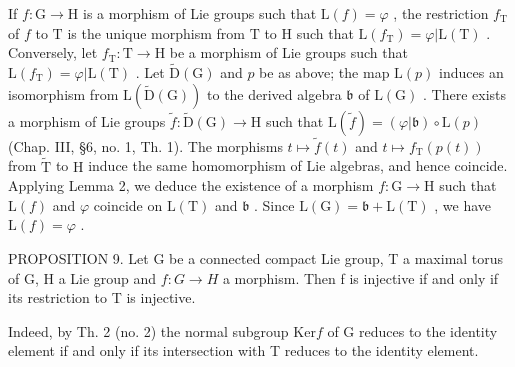 If \(f: \mathrm{G} \to \mathrm{H}\) is a morphism of Lie groups such that \(\mathrm{L}(f) = \varphi\) , the restriction \(f_{\mathrm{T}}\) of \(f\) to \(\mathrm{T}\) is the unique morphism from \(\mathrm{T}\) to \(\mathrm{H}\) such that \(\mathrm{L}(f_{\mathrm{T}}) = \varphi | \mathrm{L}(\mathrm{T})\) . Conversely, let \(f_{\mathrm{T}}: \mathrm{T} \to \mathrm{H}\) be a morphism of Lie groups such that \(\mathrm{L}(f_{\mathrm{T}}) = \varphi | \mathrm{L}(\mathrm{T})\) . Let \(\tilde{\mathrm{D}}(\mathrm{G})\) and \(p\) be as above; the map \(\mathrm{L}(p)\) induces an isomorphism from \(\mathrm{L}(\tilde{\mathrm{D}}(\mathrm{G}))\) to the derived algebra \(\mathfrak{b}\) of \(\mathrm{L}(\mathrm{G})\) . There exists a morphism of Lie groups \(\tilde{f}: \tilde{\mathrm{D}}(\mathrm{G}) \to \mathrm{H}\) such that \(\mathrm{L}(\tilde{f}) = (\varphi | \mathfrak{b}) \circ \mathrm{L}(p)\) (Chap. III, §6, no. 1, Th. 1). The morphisms \(t \mapsto \tilde{f}(t)\) and \(t \mapsto f_{\mathrm{T}}(p(t))\) from \(\tilde{\mathrm{T}}\) to \(\mathrm{H}\) induce the same homomorphism of Lie algebras, and hence coincide. Applying Lemma 2, we deduce the existence of a morphism \(f: \mathrm{G} \to \mathrm{H}\) such that \(\mathrm{L}(f)\) and \(\varphi\) coincide on \(\mathrm{L}(\mathrm{T})\) and \(\mathfrak{b}\) . Since \(\mathrm{L}(\mathrm{G}) = \mathfrak{b} + \mathrm{L}(\mathrm{T})\) , we have \(\mathrm{L}(f) = \varphi\) .

PROPOSITION 9. Let G be a connected compact Lie group, T a maximal torus of G, H a Lie group and \(f: G \to H\) a morphism. Then f is injective if and only if its restriction to T is injective.

Indeed, by Th. 2 (no. 2) the normal subgroup \(\mathrm{Ker}f\) of G reduces to the identity element if and only if its intersection with T reduces to the identity element.

